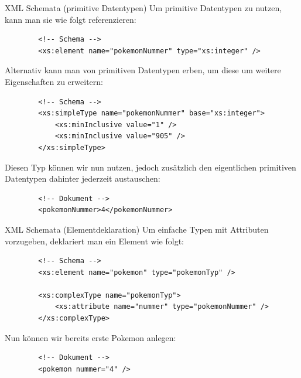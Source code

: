 \begin{example}{XML Schemata (primitive Datentypen)}
    Um primitive Datentypen zu nutzen, kann man sie wie folgt referenzieren:

    \begin{lstlisting}
        <!-- Schema -->
        <xs:element name="pokemonNummer" type="xs:integer" />
    \end{lstlisting}

    Alternativ kann man von primitiven Datentypen erben, um diese um weitere Eigenschaften zu erweitern:

    \begin{lstlisting}
        <!-- Schema -->
        <xs:simpleType name="pokemonNummer" base="xs:integer">
            <xs:minInclusive value="1" />
            <xs:minInclusive value="905" />
        </xs:simpleType>
    \end{lstlisting}

    Diesen Typ können wir nun nutzen, jedoch zusätzlich den eigentlichen primitiven Datentypen dahinter jederzeit austauschen:

    \begin{lstlisting}
        <!-- Dokument -->
        <pokemonNummer>4</pokemonNummer>
    \end{lstlisting}
\end{example}

\begin{example}{XML Schemata (Elementdeklaration)}
    Um einfache Typen mit Attributen vorzugeben, deklariert man ein Element wie folgt:

    \begin{lstlisting}
        <!-- Schema -->
        <xs:element name="pokemon" type="pokemonTyp" />

        <xs:complexType name="pokemonTyp">
            <xs:attribute name="nummer" type="pokemonNummer" />
        </xs:complexType>
    \end{lstlisting}

    Nun können wir bereits erste Pokemon anlegen:

    \begin{lstlisting}
        <!-- Dokument -->
        <pokemon nummer="4" />
    \end{lstlisting}
\end{example}

